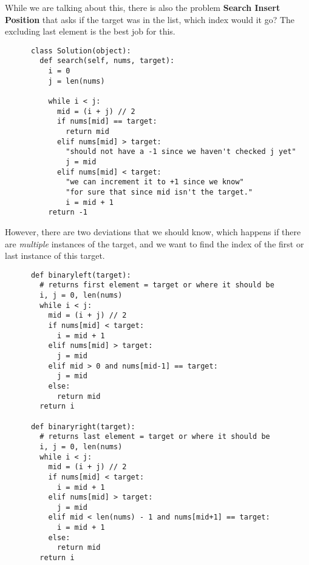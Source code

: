 \documentclass{article}
\begin{document}
  While we are talking about this, there is also the problem \textbf{Search Insert Position} that asks if the target was in the list, which index would it go? The excluding last element is the best job for this. 

  \begin{theorem}
    \begin{lstlisting}
      class Solution(object):
        def search(self, nums, target):
          i = 0 
          j = len(nums)

          while i < j: 
            mid = (i + j) // 2 
            if nums[mid] == target: 
              return mid 
            elif nums[mid] > target: 
              "should not have a -1 since we haven't checked j yet"
              j = mid     
            elif nums[mid] < target: 
              "we can increment it to +1 since we know"
              "for sure that since mid isn't the target."
              i = mid + 1           
          return -1 
    \end{lstlisting}
  \end{theorem}
  
  However, there are two deviations that we should know, which happens if there are \textit{multiple} instances of the target, and we want to find the index of the first or last instance of this target. 

  \begin{theorem}
    \begin{lstlisting}
      def binaryleft(target): 
        # returns first element = target or where it should be
        i, j = 0, len(nums) 
        while i < j: 
          mid = (i + j) // 2 
          if nums[mid] < target: 
            i = mid + 1
          elif nums[mid] > target: 
            j = mid
          elif mid > 0 and nums[mid-1] == target: 
            j = mid
          else: 
            return mid
        return i
      
      def binaryright(target): 
        # returns last element = target or where it should be 
        i, j = 0, len(nums) 
        while i < j: 
          mid = (i + j) // 2 
          if nums[mid] < target: 
            i = mid + 1
          elif nums[mid] > target: 
            j = mid
          elif mid < len(nums) - 1 and nums[mid+1] == target: 
            i = mid + 1
          else: 
            return mid
        return i
    \end{lstlisting}
  \end{theorem}
\end{document}
